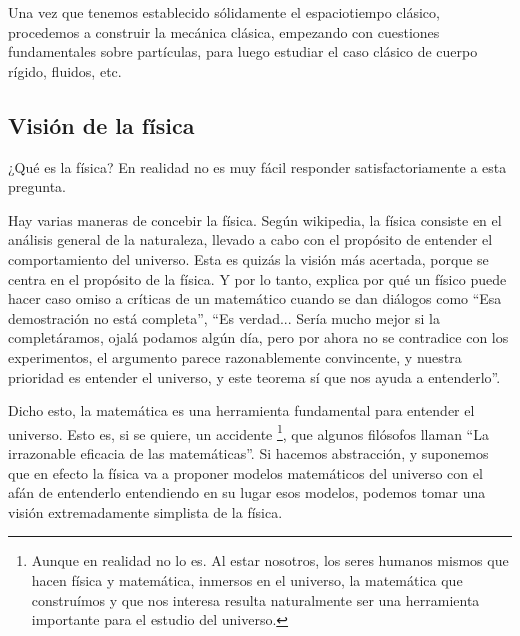 \documentclass{article}
\begin{document}
Una vez que tenemos establecido sólidamente el espaciotiempo clásico, procedemos a construir la mecánica clásica, empezando
con cuestiones fundamentales sobre partículas, para luego estudiar el caso clásico de cuerpo rígido, fluidos, etc.

\subsection{Visión de la física}

¿Qué es la física? En realidad no es muy fácil responder satisfactoriamente a esta pregunta.

Hay varias maneras de concebir la física. Según wikipedia, la física consiste en el análisis general de la naturaleza,
llevado a cabo con el propósito de entender el comportamiento del universo. Esta es quizás la visión más acertada, porque
se centra en el propósito de la física. Y por lo tanto, explica por qué un físico puede hacer caso omiso a críticas de un matemático
cuando se dan diálogos como
``Esa demostración no está completa'', ``Es verdad... Sería mucho mejor si la completáramos, ojalá podamos algún día, pero por
ahora no se contradice con los experimentos, el argumento parece razonablemente convincente, y nuestra prioridad es entender
el universo, y este teorema sí que nos ayuda a entenderlo''.

Dicho esto, la matemática es una herramienta fundamental para entender el universo. Esto es, si se quiere, un accidente
\footnote{Aunque en realidad no lo es. Al estar nosotros, los seres humanos mismos que hacen física y matemática, inmersos en el universo,
la matemática que construímos y que nos interesa resulta naturalmente ser una herramienta importante para el estudio del universo.}, que algunos filósofos
llaman ``La irrazonable eficacia de las matemáticas''. Si hacemos abstracción, y suponemos que en efecto la física va a
proponer modelos matemáticos del universo con el afán de entenderlo entendiendo en su lugar esos modelos, podemos tomar
una visión extremadamente simplista de la física.
\end{document}
